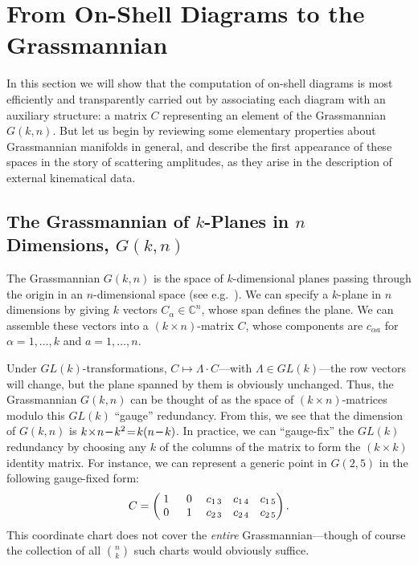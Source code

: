 \documentclass[12pt,hyperref,compress]{JHEP3}
\newcommand{\eq}[1]{\begin{equation}#1\end{equation}}
\newcommand{\mi}{{\rm\rule[2.4pt]{6pt}{0.65pt}}}
\begin{document}
\newpage
\section{From On-Shell Diagrams to the Grassmannian}\label{intro_to_grassmannian_section}

In this section we will show that the computation of on-shell diagrams is most efficiently and transparently carried out by associating each diagram with an auxiliary structure: a matrix $C$ representing an element of the Grassmannian $G(k,n)$. But let us begin by reviewing some elementary properties about Grassmannian manifolds in general, and describe the first appearance of these spaces in the story of scattering amplitudes, as they arise in the description of external kinematical data.

\subsection{The Grassmannian of $k$-Planes in $n$ Dimensions, $G(k,n)$}\label{intro_to_the_grassmannian_subsection}
The Grassmannian $G(k,n)$ is the space of $k$-dimensional planes passing through the origin in an $n$-dimensional space (see e.g.\ \cite{GriffithsHarris}). We can specify a $k$-plane in $n$ dimensions by giving $k$ vectors $C_{\alpha}\!\in\!\mathbb{C}^n$, whose span defines the plane. We can assemble these vectors into a $(k\! \times\!n)$-matrix $C$, whose components are $c_{\alpha a}$ for \mbox{$\alpha\!=\!1,\ldots, k$} and $a=1,\ldots, n$.

Under $GL(k)$-transformations, $C\!\mapsto\!\Lambda\!\cdot\!C$---with $\Lambda\!\in\! GL(k)$---the row vectors will change, but the plane spanned by them is obviously unchanged. Thus, the Grassmannian $G(k,n)$ can be thought of as the space of $(k\! \times\!n)$-matrices modulo this $GL(k)$ ``gauge'' redundancy. From this, we see that the dimension of $G(k,n)$ is $k\!\times\!n\,\mi\,k^2\!=\!k(n\,\mi\,k)$. In practice, we can ``gauge-fix'' the $GL(k)$ redundancy by choosing any $k$ of the columns of the matrix to form the $(k\!\times\!k)$ identity matrix. For instance, we can represent a generic point in $G(2,5)$ in the following gauge-fixed form:
\vspace{-.3cm}\eq{C=\left(\begin{array}{@{}ccccc@{}}\;1\;&\;0\;& c_{1\,3} & c_{1\,4} & c_{1\,5} \\ 0 & 1 & c_{2\,3} & c_{2\,4} & c_{2\,5} \end{array} \right).\vspace{-.2cm}\label{gauge_fixed_rep_of_g25}}
This coordinate chart does not cover the {\it entire} Grassmannian---though of course the collection of all $\binom{n}{k}$ such charts would obviously suffice.
\end{document}
